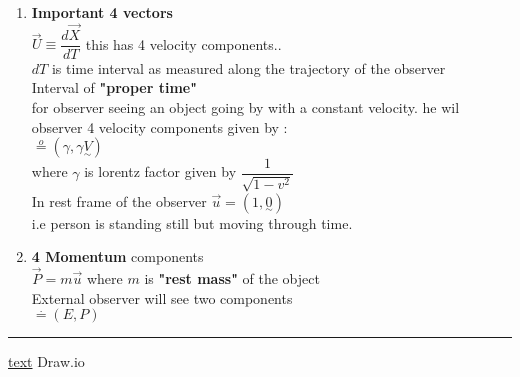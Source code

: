 \documentclass[11pt,a4paper]{article}
\begin{document}
\begin{enumerate}
\begin{enumerate}
\begin{enumerate}
                        \item \textbf{Important 4 vectors}\\
                              $\vec{U}\equiv  \dfrac{d\vec{X}}{dT}$ this has 4 velocity components..\\
                              $dT$ is time interval as measured along the trajectory of the observer \\
                              Interval of \textbf{"proper time"}\\
                              for observer seeing an object going by with a constant velocity. he wil observer 4 velocity components given by :\\
                              $\mathop = \limits^{o}_{} (\gamma,\gamma \underset{\sim}{V})$\\
                              where $\gamma$ is lorentz factor given by $\dfrac{1}{\sqrt{1-v^2}}$\\
                              In rest frame of the observer $\vec{u} = (1,\underset{\sim}{0})$\\
                              i.e person is standing still but moving through time.\\
                        \item \textbf{4 Momentum} components\\
                              $\vec{P} = m \vec{u}$ where $m$ is \textbf{"rest mass"} of the object\\
                              External observer will see two components\\
                              $\mathop = \limits^{\cdot}_{} (E,P)$

                    \end{enumerate}
          \end{enumerate}
\end{enumerate}
\noindent\rule{\textwidth}{1pt}
\href{https://youtu.be/TiHHz3sKDbY?list=PL6Q1107aDr%SgQ1DBEugejXLfQX76hfSnX&t=1188}{text} Draw.io
\end{document}
